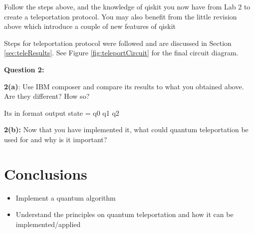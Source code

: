 Follow the steps above, and the knowledge of qiskit you now have from Lab 2 to create a teleportation protocol. You may also benefit from the little revision above which introduce a couple of new features of qiskit

Steps for teleportation protocol were followed and are discussed in Section \ref{sec:teleResults}. See Figure \ref{fig:teleportCircuit} for the final circuit diagram.

\textbf{Question 2:}

\textbf{2(a)}: Use IBM composer and compare its results to what you obtained above. Are they different? How so?

Its in format output state = q0 q1 q2

\textbf{2(b):} Now that you have implemented it, what could quantum teleportation be used for and why is it important?

\section{Conclusions}

\begin{itemize}
    \item Implement a quantum algorithm
    \item Understand the principles on quantum teleportation and how it can be implemented/applied
\end{itemize}